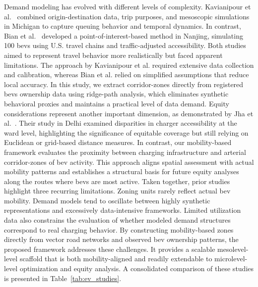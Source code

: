 Demand modeling has evolved with different levels of complexity. Kavianipour et al.~\cite{KAVIANIPOUR2021} combined origin-destination data, trip purposes, and mesoscopic simulations in Michigan to capture queuing behavior and temporal dynamics. In contrast, Bian et al.~\cite{bian_planning_2022} developed a point-of-interest-based method in Nanjing, simulating 100 \glspl{bev} using U.S. travel chains and traffic-adjusted accessibility. Both studies aimed to represent travel behavior more realistically but faced apparent limitations. The approach by Kavianipour et al. required extensive data collection and calibration, whereas Bian et al. relied on simplified assumptions that reduce local accuracy. In this study, we extract corridor-zones directly from registered \glspl{bev} ownership data using ridge-path analysis, which eliminates synthetic behavioral proxies and maintains a practical level of data demand.
Equity considerations represent another important dimension, as demonstrated by Jha et al.~\cite{JHA2025}. Their study in Delhi examined disparities in charger accessibility at the ward level, highlighting the significance of equitable coverage but still relying on Euclidean or grid-based distance measures. In contrast, our mobility-based framework evaluates the proximity between charging infrastructure and arterial corridor-zones of \gls{bev} activity. This approach aligns spatial assessment with actual mobility patterns and establishes a structural basis for future equity analyses along the routes where \glspl{bev} are most active.
Taken together, prior studies highlight three recurring limitations. Zoning units rarely reflect actual \gls{bev} mobility. Demand models tend to oscillate between highly synthetic representations and excessively data-intensive frameworks. Limited utilization data also constrains the evaluation of whether modeled demand structures correspond to real charging behavior. By constructing mobility-based zones directly from vector road networks and observed \gls{bev} ownership patterns, the proposed framework addresses these challenges. It provides a scalable \gls{mesolevel}-level scaffold that is both mobility-aligned and readily extendable to \gls{microlevel}-level optimization and equity analysis. A consolidated comparison of these studies is presented in Table~\ref{tab:ev_studies}.
